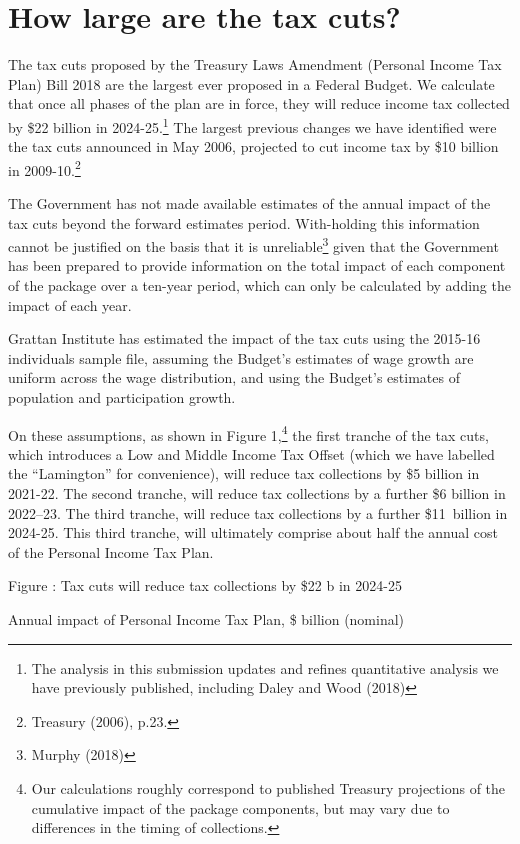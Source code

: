 \documentclass[submission]{grattan}\usepackage[]{graphicx}\usepackage[]{color}
\begin{document}
\chapter{How large are the tax cuts?}\label{chap:how-large-are-the-tax-cuts}

The tax cuts proposed by the Treasury Laws Amendment (Personal Income Tax Plan) Bill 2018 are the largest ever proposed in a Federal Budget. We calculate that once all phases of the plan are in force, they will reduce income tax collected by \$22 billion in 2024-25.\footnote{The analysis in this submission updates and refines quantitative analysis we have previously published, including Daley and Wood (2018)} The largest previous changes we have identified were the tax cuts announced in May 2006, projected to cut income tax by \$10 billion in 2009-10.\footnote{Treasury (2006), p.23.}

The Government has not made available estimates of the annual impact of the tax cuts beyond the forward estimates period. With-holding this information cannot be justified on the basis that it is unreliable\footnote{Murphy (2018)} given that the Government has been prepared to provide information on the total impact of each component of the package over a ten-year period, which can only be calculated by adding the impact of each year.

Grattan Institute has estimated the impact of the tax cuts using the 2015-16 individuals sample file, assuming the Budget's estimates of wage growth are uniform across the wage distribution, and using the Budget's estimates of population and participation growth.

On these assumptions, as shown in Figure 1,\footnote{Our calculations roughly correspond to published Treasury projections of the cumulative impact of the package components, but may vary due to differences in the timing of collections.} the first tranche of the tax cuts, which introduces a Low and Middle Income Tax Offset (which we have labelled the ``Lamington'' for convenience), will reduce tax collections by \$5 billion in 2021-22. The second tranche, will reduce tax collections by a further \$6 billion in 2022--23. The third tranche, will reduce tax collections by a further \$11~billion in 2024-25. This third tranche, will ultimately comprise about half the annual cost of the Personal Income Tax Plan.

Figure : Tax cuts will reduce tax collections by \$22 b in 2024-25

Annual impact of Personal Income Tax Plan, \$ billion (nominal)
\end{document}
